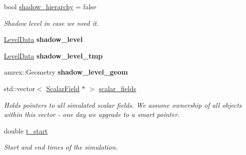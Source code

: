 \begin{DoxyCompactItemize}
bool \mbox{\hyperlink{classsledgehamr_1_1Sledgehamr_a0f4b66c05d9b5b7f5f4acb5fc5dfd84b}{shadow\+\_\+hierarchy}} = false
\begin{DoxyCompactList}\small\item\em Shadow level in case we need it. \end{DoxyCompactList}\item 
\mbox{\label{classsledgehamr_1_1Sledgehamr_ada6b4c3b50b154743da391ed7a5be79c}} 
\mbox{\hyperlink{classsledgehamr_1_1LevelData}{Level\+Data}} {\bfseries shadow\+\_\+level}
\item 
\mbox{\label{classsledgehamr_1_1Sledgehamr_a9107cfee4ed83f1e8a8478adb5beb496}} 
\mbox{\hyperlink{classsledgehamr_1_1LevelData}{Level\+Data}} {\bfseries shadow\+\_\+level\+\_\+tmp}
\item 
\mbox{\label{classsledgehamr_1_1Sledgehamr_a87fd1439441652a76e34441ac9bc6bde}} 
amrex\+::\+Geometry {\bfseries shadow\+\_\+level\+\_\+geom}
\item 
\mbox{\label{classsledgehamr_1_1Sledgehamr_adf5dfa6bf28cbd2a7c3acf5928495222}} 
std\+::vector$<$ \mbox{\hyperlink{classsledgehamr_1_1ScalarField}{Scalar\+Field}} $\ast$ $>$ \mbox{\hyperlink{classsledgehamr_1_1Sledgehamr_adf5dfa6bf28cbd2a7c3acf5928495222}{scalar\+\_\+fields}}
\begin{DoxyCompactList}\small\item\em Holds pointers to all simulated scalar fields. We assume ownership of all objects within this vector -\/ one day we upgrade to a smart pointer. \end{DoxyCompactList}\item 
\mbox{\label{classsledgehamr_1_1Sledgehamr_ab39530956a51008b7eeb2d61f4eb14f5}} 
double \mbox{\hyperlink{classsledgehamr_1_1Sledgehamr_ab39530956a51008b7eeb2d61f4eb14f5}{t\+\_\+start}}
\begin{DoxyCompactList}\small\item\em Start and end times of the simulation. \end{DoxyCompactList}\item 
\mbox{\label{classsledgehamr_1_1Sledgehamr_a307c02ed0980a082fafb88578121df9d}} 

\end{DoxyCompactItemize}
